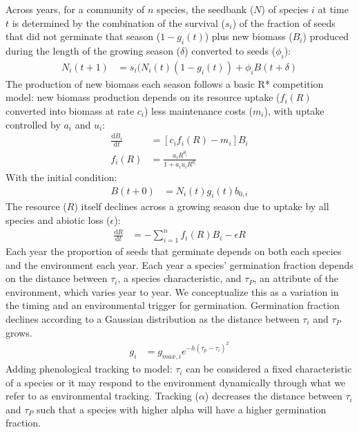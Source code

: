 \documentclass[11pt,letterpaper]{article}
\begin{document}
Across years, for a community of \(n\) species, the seedbank ($N$) of species $i$ at time $t$ is determined by the combination of the survival ($s_i$) of the fraction of seeds that did not germinate that season ($1-g_{i}(t)$) plus new biomass ($B_i$) produced during the length of the  growing season ($\delta$) converted to seeds ($\phi_i$):
\begin{align}
N_{i}(t+1) & =
s_{i}(N_{i}(t)(1-g_{i}(t))+\phi_{i}B(t+\delta)
\end{align}
The production of new biomass each season follows a basic R* competition model: new biomass production depends on its resource uptake ($f_i(R)$ converted into biomass at rate $c_i$) less maintenance costs ($m_i$), with uptake controlled by $a_i$ and $u_i$:
\begin{align}
\frac{\mathrm{d}B_{i}}{\mathrm{d}t} &  = [c_{i}f_{i}(R) - m_{i}]B_{i} 
\\
f_{i}(R) & = \frac{a_{i}R^{\theta_{i}}}{1+a_{i}u_{i}R^{\theta_{i}}}
\end{align}
With the initial condition:
\begin{align}
B(t+0) & = N_{i}(t)g_{i}(t)b_{0,i}
\end{align}
The resource ($R$) itself declines across a growing season due to uptake by all species and abiotic loss ($\epsilon$):
\begin{align}
\frac{\mathrm{d}R}{\mathrm{d}t} & = - \sum_{i=1}^{n}f_{i}(R)B_{i} -\epsilon R
\end{align}
Each year the proportion of seeds that germinate depends on both each species and the environment each year. Each year a species' germination fraction depends on the distance between $\tau_i$, a species characteristic, and $\tau_P$, an attribute of the environment, which varies year to year. We conceptualize this as a variation in the timing and an environmental trigger for germination. Germination fraction declines according to a Gaussian distribution as the distance between $\tau_i$ and $\tau_P$ grows. 
\begin{align}
g_{i} & = g_{max,i}e^{-h(\tau_{p}-\tau_{i})^2} 
\end{align}
\noindent Adding phenological tracking to model: 
$\tau_i$ can be considered a fixed characteristic of a species or it may respond to the environment dynamically through what we refer to as environmental tracking. Tracking ($\alpha$) decreases the distance between $\tau_i$ and $\tau_P$ such that a species with higher alpha will have a higher germination fraction.
\end{document}
